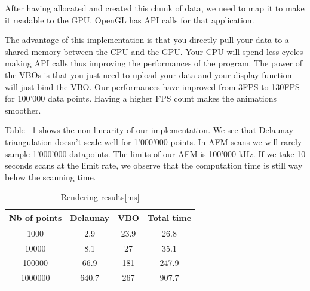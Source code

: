 After having allocated and created this chunk of data, we need to map it to make it readable to the GPU. OpenGL has API calls for that application.

The advantage of this implementation is that you directly pull your data to a shared memory between the CPU and the GPU. Your CPU will spend less cycles making API calls thus improving the performances of the program. The power of the VBOs is that you just need to upload your data and your display function will just bind the VBO. Our performances have improved from 3FPS to 130FPS for 100'000 data points. Having a higher FPS count makes the animations smoother.

Table  ~\ref{table:nonlin} shows the non-linearity of our implementation. We see that Delaunay triangulation doesn't scale well for 1'000'000 points. In AFM scans we will rarely sample 1'000'000 datapoints. The limits of our AFM is 100'000 kHz. If we take 10 seconds scans at the limit rate, we observe that the computation time is still way below the scanning time. 

\begin{table}[ht]
\caption{Rendering results[ms]} %
\centering %
\begin{tabular}{c |c c| c } %
\hline\hline %
 Nb of points & Delaunay & VBO & Total time\\ [0.5ex] %
\hline %

1000 & 2.9 & 23.9 & 26.8 \\
10000 & 8.1	&	27 	& 35.1\\
100000 & 66.9 & 181 & 247.9 \\
1000000 & 640.7	& 267 & 907.7\\[1ex]


\hline %
\end{tabular}
\label{table:nonlin} %
\end{table}


